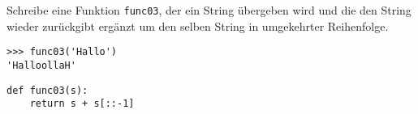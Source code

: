 \question[3] Schreibe eine Funktion \texttt{func03}, der ein String übergeben wird und die
den String wieder zurückgibt ergänzt um den selben String in umgekehrter Reihenfolge.
\begin{lstlisting}
>>> func03('Hallo')
'HalloollaH'
\end{lstlisting}
\begin{solutionbox}{4cm}
\begin{lstlisting}
def func03(s):
    return s + s[::-1]
\end{lstlisting}
\end{solutionbox}
